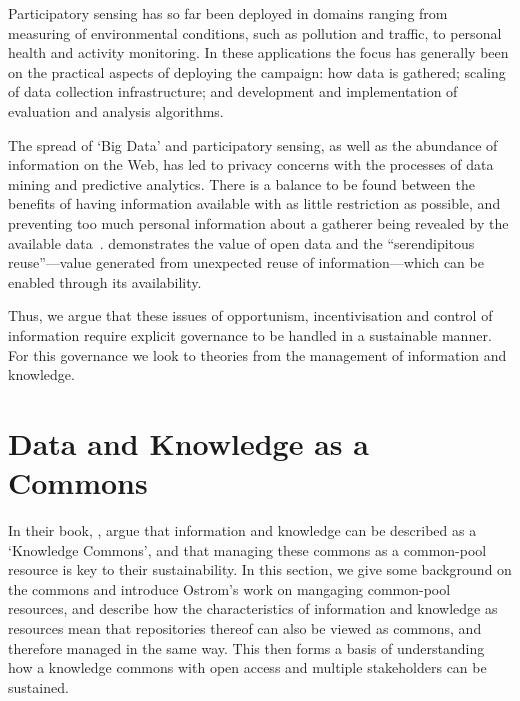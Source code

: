 Participatory sensing has so far been deployed in domains ranging from
measuring of environmental conditions, such as pollution and traffic, to
personal health and activity monitoring. In these applications the focus has
generally been on the practical aspects of deploying the campaign: how data is
gathered; scaling of data collection infrastructure; and development and
implementation of evaluation and analysis algorithms. 


The spread of `Big Data' and participatory sensing, as well as the abundance
of information on the Web, has led to privacy concerns with the
processes of data mining and predictive analytics. There is a balance to be
found between the benefits of having information available with as little
restriction as possible, and preventing too much personal information about a
gatherer being revealed by the available data~\citep{ohara2010}.
\citet{Shadbolt2012} demonstrates the value of open data and the
``serendipitous reuse''---value generated from unexpected reuse of 
information---which can be enabled through its availability.


Thus, we argue that these issues of opportunism, incentivisation and control
of information require explicit governance to be handled in a sustainable
manner. For this governance we look to theories from the management of
information and knowledge. %

\section{Data and Knowledge as a Commons}\label{sec:commons}

In their book, \citet{Hess2007}, argue that information and knowledge can be
described as a `Knowledge Commons', and that managing these commons as a
common-pool resource is key to their sustainability. In this section, we give
some background on the commons and introduce Ostrom's work on mangaging
common-pool resources, and describe how the characteristics of information and
knowledge as resources mean that repositories thereof can also be viewed as
commons, and therefore managed in the same way. This then forms a basis of
understanding how a knowledge commons with open access and multiple
stakeholders can be sustained. %

